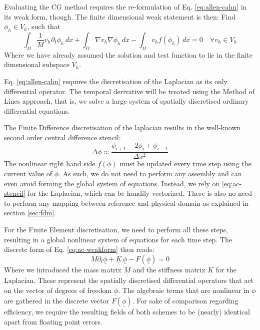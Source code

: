\documentclass[sn-mathphys,Numbered]{sn-jnl}%
\theoremstyle{thmstyleone}%
\theoremstyle{thmstyletwo}%
\theoremstyle{thmstylethree}%
\begin{document}
Evaluating the CG method requires the re-formulation of Eq. \ref{eq:allen-cahn} in its weak form, though.
The finite dimensional weak statement is then: Find $\phi_h \in V_h$, such that
\begin{equation}\label{eq:ac-weakform}
    \int_\Omega \frac{1}{M} v_h \partial_t \phi_h \,dx + \int_\Omega \nabla v_h \nabla \phi_h \,dx - \int_\Omega v_h f(\phi_h) \,dx = 0 \quad \forall v_h \in V_h
\end{equation}
Where we have already assumed the solution and test function to lie in the finite dimensional subspace $V_h$.

Eq. \ref{eq:allen-cahn} requires the discretisation of the Laplacian as its only differential operator.
The temporal derivative will be treated using the Method of Lines approach, that is,  we solve a large system of spatially discretised ordinary differential equations.

The Finite Difference discretisation of the laplacian results in the well-known second order central difference stencil:
\begin{equation} \label{eq:ac-stencil}
    \Delta \phi \approx \frac{\phi_{i+1} - 2 \phi_{i} + \phi_{i-1}}{\Delta x^2}
\end{equation}
The nonlinear right hand side $f(\phi)$ must be updated every time step using the current value of $\phi$.
As such, we do not need to perform any assembly and can even avoid forming the global system of equations.
Instead, we rely on \ref{eq:ac-stencil} for the Laplacian, which can be handily vectorized.
There is also no need to perform any mapping between reference and physical domain as explained in section \ref{sec:fdm}.

For the Finite Element discretisation, we need to perform all these steps, resulting in a global nonlinear system of equations for each time step. The discrete form of Eq. \ref{eq:ac-weakform} then reads:
\begin{equation}
    \underline{\underline{M}} \partial_t \underline{\phi} + \underline{\underline{K}} \, \underline{\phi} - F(\underline{\phi}) = 0
\end{equation}
Where we introduced the mass matrix $\underline{\underline{M}}$ and the stiffness matrix $\underline{\underline{K}}$ for the Laplacian.
These represent the spatially discretised differential operators that act on the vector of degrees of freedom $\underline{\phi}$.
The algebraic terms that are nonlinear in $\underline{\phi}$ are gathered in the discrete vector $F(\underline{\phi})$.
For sake of comparison regarding efficiency, we require the resulting fields of both schemes to be (nearly) identical apart from floating point errors. 
\end{document}
